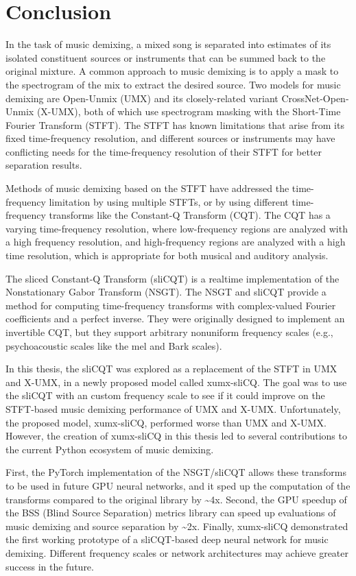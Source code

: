 \documentclass[report.tex]{subfiles}
\begin{document}
\section{Conclusion}
\label{ch:conclusion}

In the task of music demixing, a mixed song is separated into estimates of its isolated constituent sources or instruments that can be summed back to the original mixture. A common approach to music demixing is to apply a mask to the spectrogram of the mix to extract the desired source. Two models for music demixing are Open-Unmix (UMX) and its closely-related variant CrossNet-Open-Unmix (X-UMX), both of which use spectrogram masking with the Short-Time Fourier Transform (STFT). The STFT has known limitations that arise from its fixed time-frequency resolution, and different sources or instruments may have conflicting needs for the time-frequency resolution of their STFT for better separation results.

Methods of music demixing based on the STFT have addressed the time-frequency limitation by using multiple STFTs, or by using different time-frequency transforms like the Constant-Q Transform (CQT). The CQT has a varying time-frequency resolution, where low-frequency regions are analyzed with a high frequency resolution, and high-frequency regions are analyzed with a high time resolution, which is appropriate for both musical and auditory analysis.

The sliced Constant-Q Transform (sliCQT) is a realtime implementation of the Nonstationary Gabor Transform (NSGT). The NSGT and sliCQT provide a method for computing time-frequency transforms with complex-valued Fourier coefficients and a perfect inverse. They were originally designed to implement an invertible CQT, but they support arbitrary nonuniform frequency scales (e.g., psychoacoustic scales like the mel and Bark scales).

In this thesis, the sliCQT was explored as a replacement of the STFT in UMX and X-UMX, in a newly proposed model called xumx-sliCQ. The goal was to use the sliCQT with an custom frequency scale to see if it could improve on the STFT-based music demixing performance of UMX and X-UMX. Unfortunately, the proposed model, xumx-sliCQ, performed worse than UMX and X-UMX. However, the creation of xumx-sliCQ in this thesis led to several contributions to the current Python ecosystem of music demixing.

First, the PyTorch implementation of the NSGT/sliCQT allows these transforms to be used in future GPU neural networks, and it sped up the computation of the transforms compared to the original library by \textasciitilde4x. Second, the GPU speedup of the BSS (Blind Source Separation) metrics library can speed up evaluations of music demixing and source separation by \textasciitilde2x. Finally, xumx-sliCQ demonstrated the first working prototype of a sliCQT-based deep neural network for music demixing. Different frequency scales or network architectures may achieve greater success in the future.
\end{document}
